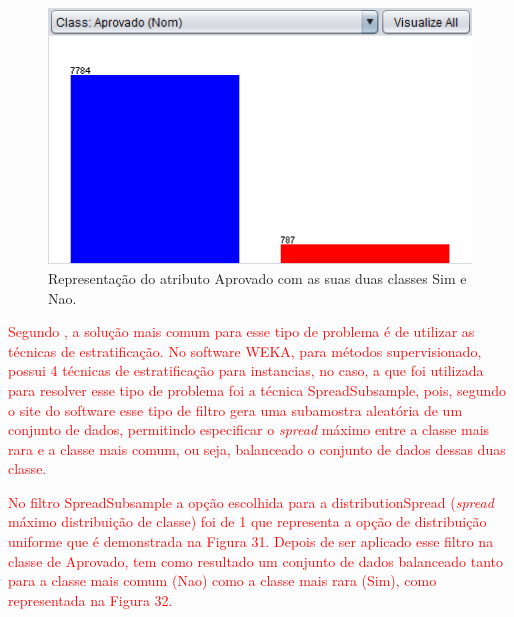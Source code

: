 \par
\begin{figure}[!htp]
	\begin{center}
    \caption{\label{fig:waveform_fig} Representação do atributo Aprovado com as suas duas classes Sim e Nao.}
	\includegraphics[scale=0.90]{Figuras/Atributo_aprovado.png}
	\end{center}
\end{figure}

\par
\textcolor{red}{}


\par
\textcolor{red}{Segundo , a solução mais comum para esse tipo de problema é de utilizar as técnicas de estratificação. No software WEKA, para métodos supervisionado, possui 4 técnicas de estratificação para instancias, no caso, a que foi utilizada para resolver esse tipo de problema foi a técnica SpreadSubsample, pois, segundo o site do software  esse tipo de filtro gera uma subamostra aleatória de um conjunto de dados, permitindo especificar o \textit{spread} máximo entre a classe mais rara e a classe mais comum, ou seja, balanceado o conjunto de dados dessas duas classe.}

\par
\textcolor{red}{No filtro SpreadSubsample a opção escolhida para a distributionSpread (\textit{spread} máximo distribuição de classe) foi de 1 que representa a opção de distribuição uniforme que é demonstrada na Figura 31. Depois de ser aplicado esse filtro na classe de Aprovado, tem como resultado um conjunto de dados balanceado tanto para a classe mais comum (Nao) como a classe mais rara (Sim), como representada na Figura 32.}

